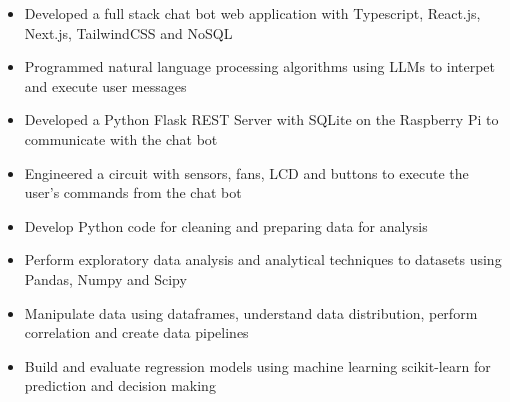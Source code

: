 \documentclass[11pt,a4paper,ragged2e]{altacv}
\begin{document}
\begin{paracol}{1}

\tightdivider


\begin{itemize}
\item Developed a full stack chat bot web application with Typescript, React.js, Next.js, TailwindCSS and NoSQL
\item Programmed natural language processing algorithms using LLMs to interpet and execute user messages 
\item Developed a Python Flask REST Server with SQLite on the Raspberry Pi to communicate with the chat bot
\item Engineered a circuit with sensors, fans, LCD and buttons to execute the user's commands from the chat bot 
\end{itemize}

\medskip

\begin{itemize}
\item Develop Python code for cleaning and preparing data for analysis 
\item Perform exploratory data analysis and analytical techniques to datasets using Pandas, Numpy and Scipy
\item Manipulate data using dataframes, understand data distribution, perform correlation and create data pipelines
\item Build and evaluate regression models using machine learning scikit-learn for prediction and decision making
\end{itemize}
\tightdivider


\end{paracol}
\end{document}
